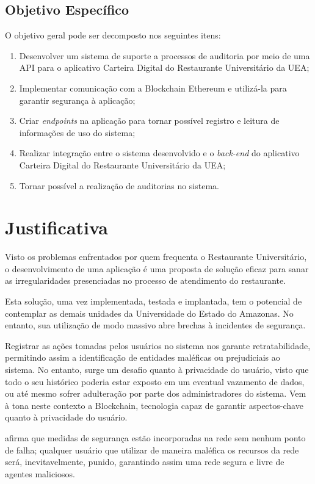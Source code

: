 \subsection{Objetivo Específico}
O objetivo geral pode ser decomposto nos seguintes itens:
\begin{enumerate}
    \item Desenvolver um sistema de suporte a processos de auditoria por meio de uma API para o aplicativo Carteira Digital do Restaurante Universitário da UEA;
    \item Implementar comunicação com a Blockchain Ethereum e utilizá-la para garantir segurança à aplicação;
    \item Criar \emph{endpoints} na aplicação para tornar possível registro e leitura de informações de uso do sistema;
    \item Realizar integração entre o sistema desenvolvido e o \emph{back-end} do aplicativo Carteira Digital do Restaurante Universitário da UEA;
    \item Tornar possível a realização de auditorias no sistema.
\end{enumerate}


\section{Justificativa}
Visto os problemas enfrentados por quem frequenta o Restaurante Universitário, o desenvolvimento de uma aplicação é uma proposta de solução eficaz para sanar as irregularidades presenciadas no processo de atendimento do restaurante.

Esta solução, uma vez implementada, testada e implantada, tem o potencial de contemplar as demais unidades da Universidade do Estado do Amazonas. No entanto, sua utilização de modo massivo abre brechas à incidentes de segurança.

Registrar as ações tomadas pelos usuários no sistema nos garante retratabilidade, permitindo assim a identificação de entidades maléficas ou prejudiciais ao sistema. No entanto, surge um desafio quanto à privacidade do usuário, visto que todo o seu histórico poderia estar exposto em um eventual vazamento de dados, ou até mesmo sofrer adulteração por parte dos administradores do sistema. Vem à tona neste contexto a Blockchain, tecnologia capaz de garantir aspectos-chave quanto à privacidade do usuário.

\cite{Tapscott2016} afirma que medidas de segurança estão incorporadas na rede sem nenhum ponto de falha; qualquer usuário que utilizar de maneira maléfica os recursos da rede será, inevitavelmente, punido, garantindo assim uma rede segura e livre de agentes maliciosos.

